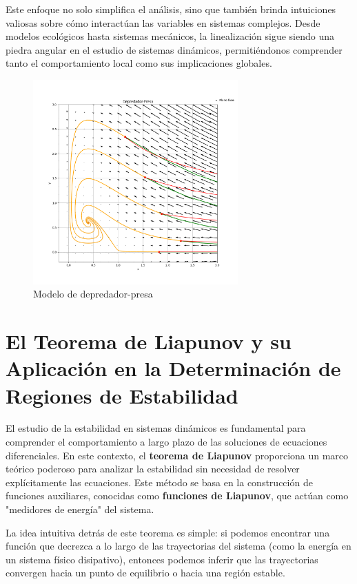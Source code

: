 Este enfoque no solo simplifica el análisis, sino que también brinda intuiciones valiosas sobre cómo interactúan las variables en sistemas complejos. Desde modelos ecológicos hasta sistemas mecánicos, la linealización sigue siendo una piedra angular en el estudio de sistemas dinámicos, permitiéndonos comprender tanto el comportamiento local como sus implicaciones globales.

\begin{figure}[h]
    \centering
    \includegraphics[width=0.7\textwidth]{Img/DepredadorPresa.png}
    \caption{Modelo de depredador-presa}
    \label{fig:modelo_depredador_presa}
\end{figure}


\section{El Teorema de Liapunov y su Aplicación en la Determinación de Regiones de Estabilidad}

El estudio de la estabilidad en sistemas dinámicos es fundamental para comprender el comportamiento a largo plazo de las soluciones de ecuaciones diferenciales. En este contexto, el \textbf{teorema de Liapunov} proporciona un marco teórico poderoso para analizar la estabilidad sin necesidad de resolver explícitamente las ecuaciones. Este método se basa en la construcción de funciones auxiliares, conocidas como \textbf{funciones de Liapunov}, que actúan como "medidores de energía" del sistema.

La idea intuitiva detrás de este teorema es simple: si podemos encontrar una función que decrezca a lo largo de las trayectorias del sistema (como la energía en un sistema físico disipativo), entonces podemos inferir que las trayectorias convergen hacia un punto de equilibrio o hacia una región estable.

